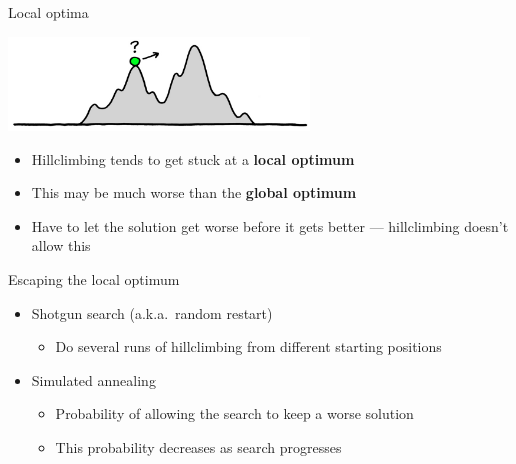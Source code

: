 \begin{frame}{Local optima}
	\pause
	\begin{center}
		\includegraphics[width=0.6\textwidth]{local_optimum}
	\end{center}
	\begin{itemize}
		\pause\item Hillclimbing tends to get stuck at a \textbf{local optimum}
		\pause\item This may be much worse than the \textbf{global optimum}
		\pause\item Have to let the solution get worse before it gets better ---
			hillclimbing doesn't allow this
	\end{itemize}
\end{frame}

\begin{frame}{Escaping the local optimum}
	\begin{itemize}
		\pause\item Shotgun search (a.k.a.\ random restart)
			\begin{itemize}
				\pause\item Do several runs of hillclimbing from different starting positions
			\end{itemize}
		\pause\item Simulated annealing
			\begin{itemize}
				\pause\item Probability of allowing the search to keep a worse solution
				\pause\item This probability decreases as search progresses
			\end{itemize}
	\end{itemize}
\end{frame}

